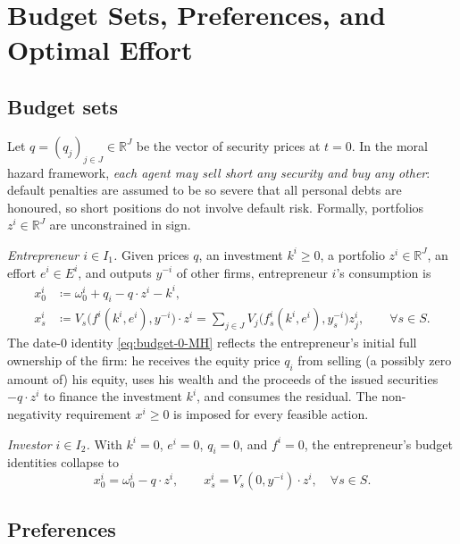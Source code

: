\documentclass[11pt,a4paper,oneside]{book}
\def\R{\mathbb{R}}
\def\geq{\geqslant}
\theoremstyle{plain}
\theoremstyle{definition}
\theoremstyle{remark}
\numberwithin{equation}{chapter}
\begin{document}
\section{Budget Sets, Preferences, and Optimal Effort}
\label{sec:MH-budgets}

\subsection{Budget sets}

Let $q = (q_j)_{j \in J} \in \R^J$ be the vector of security prices at $t=0$.
In the moral hazard framework, \emph{each agent may sell short any security and buy any other}: default penalties are assumed to be so severe that all personal debts are honoured, so short positions do not involve default risk.
Formally, portfolios $z^i \in \R^J$ are unconstrained in sign.

\emph{Entrepreneur $i \in I_1$.}
Given prices $q$, an investment $k^i \geq 0$, a portfolio $z^i \in \R^J$, an effort $e^i \in E^i$, and outputs $y^{-i}$ of other firms, entrepreneur $i$'s consumption is
\begin{align}
  x^i_0
  &\coloneqq \omega^i_0 + q_i - q \cdot z^i - k^i,
  \label{eq:budget-0-MH}\\[2pt]
  x^i_s
  &\coloneqq V_s\bigl( f^i(k^i, e^i), y^{-i} \bigr) \cdot z^i
  = \sum_{j \in J} V_j\bigl( f^i_s(k^i, e^i), y^{-i}_s \bigr) z^i_j,
  \qquad \forall s \in S.
  \label{eq:budget-s-MH}
\end{align}
The date-$0$ identity \eqref{eq:budget-0-MH} reflects the entrepreneur's initial full ownership of the firm: he receives the equity price $q_i$ from selling (a possibly zero amount of) his equity, uses his wealth and the proceeds of the issued securities $-q \cdot z^i$ to finance the investment $k^i$, and consumes the residual.
The non-negativity requirement $x^i \geq 0$ is imposed for every feasible action.

\emph{Investor $i \in I_2$.}
With $k^i = 0$, $e^i = 0$, $q_i = 0$, and $f^i = 0$, the entrepreneur's budget identities collapse to
\begin{equation*}
  x^i_0 = \omega^i_0 - q \cdot z^i, \qquad
  x^i_s = V_s(0, y^{-i}) \cdot z^i, \quad \forall s \in S.
\end{equation*}

\subsection{Preferences}
\end{document}
